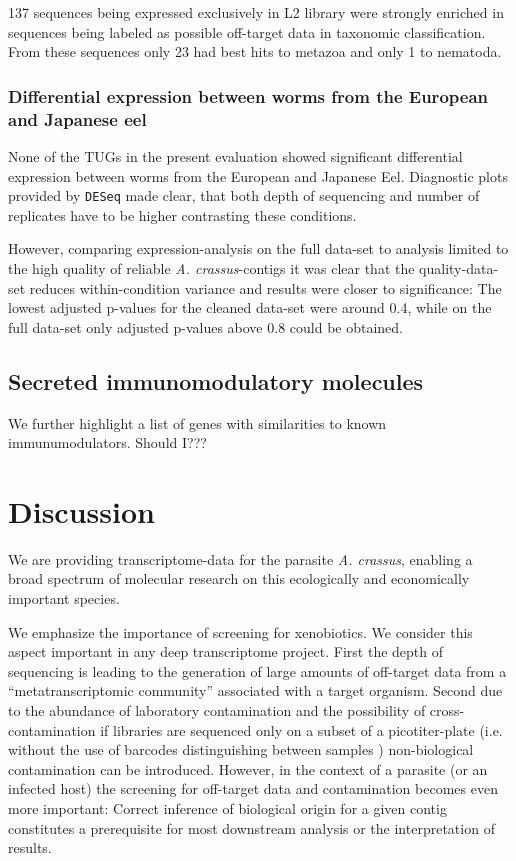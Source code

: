 \documentclass[10pt]{bmc_article}
\newenvironment{bmcformat}{\begin{raggedright}\baselineskip20pt\sloppy\setboolean{publ}{false}}{\end{raggedright}\baselineskip20pt\sloppy}
\begin{document}
\begin{bmcformat}
137 sequences being expressed exclusively
in L2 library were strongly enriched in sequences being labeled as
possible off-target data in taxonomic classification. From these
sequences only 23 had best hits to metazoa and only
1 to nematoda.

\subsubsection*{Differential expression between worms from the European
  and Japanese eel}

None of the TUGs in the present evaluation showed significant
differential expression between worms from the European and Japanese
Eel. Diagnostic plots provided by \texttt{DESeq} made clear, that both
depth of sequencing and number of replicates have to be higher
contrasting these conditions.

However, comparing expression-analysis on the full data-set to analysis
limited to the high quality of reliable \textit{A. crassus}-contigs it
was clear that the quality-data-set reduces within-condition variance
and results were closer to significance: The lowest adjusted p-values
for the cleaned data-set were around 0.4, while on the full data-set
only adjusted p-values above 0.8 could be obtained.

\subsection*{Secreted immunomodulatory molecules}

We further highlight a list of genes with similarities to known
immunumodulators. Should I???


\section*{Discussion}

We are providing transcriptome-data for the parasite
\textit{A. crassus}, enabling a broad spectrum of molecular research
on this ecologically and economically important species.

We emphasize the importance of screening for xenobiotics. We consider
this aspect important in any deep transcriptome project. First the
depth of sequencing is leading to the generation of large amounts of
off-target data from a ``metatranscriptomic community'' associated with a
target organism. Second due to the abundance of laboratory
contamination and the possibility of cross-contamination if libraries
are sequenced only on a subset of a picotiter-plate (i.e. without the
use of barcodes distinguishing between samples \cite{pmid20137071})
non-biological contamination can be introduced. 
However, in the context of a parasite (or an infected host) the
screening for off-target data and contamination becomes even more
important: Correct inference of biological origin for a given contig
constitutes a prerequisite for most downstream analysis or the
interpretation of results.


\end{bmcformat}
\end{document}
